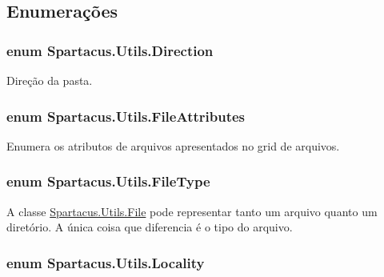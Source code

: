 \subsection{Enumerações}
\hypertarget{namespaceSpartacus_1_1Utils_a71ccbdd8fb504defa1e9ea38771651e5}{
\subsubsection[{Direction}]{\setlength{\rightskip}{0pt plus 5cm}enum {\bf Spartacus.\+Utils.\+Direction}}}\label{namespaceSpartacus_1_1Utils_a71ccbdd8fb504defa1e9ea38771651e5}


Direção da pasta. 

\hypertarget{namespaceSpartacus_1_1Utils_a81ab9f259fbae2db00ea1cd29690a6cf}{
\subsubsection[{File\+Attributes}]{\setlength{\rightskip}{0pt plus 5cm}enum {\bf Spartacus.\+Utils.\+File\+Attributes}}}\label{namespaceSpartacus_1_1Utils_a81ab9f259fbae2db00ea1cd29690a6cf}


Enumera os atributos de arquivos apresentados no grid de arquivos. 

\hypertarget{namespaceSpartacus_1_1Utils_a2bc44488e88db523cb2dcffaa6e77541}{
\subsubsection[{File\+Type}]{\setlength{\rightskip}{0pt plus 5cm}enum {\bf Spartacus.\+Utils.\+File\+Type}}}\label{namespaceSpartacus_1_1Utils_a2bc44488e88db523cb2dcffaa6e77541}


A classe \hyperlink{classSpartacus_1_1Utils_1_1File}{Spartacus.\+Utils.\+File} pode representar tanto um arquivo quanto um diretório. A única coisa que diferencia é o tipo do arquivo. 

\hypertarget{namespaceSpartacus_1_1Utils_a64d6efe7b3923d4631036138e1b8b57f}{
\subsubsection[{Locality}]{\setlength{\rightskip}{0pt plus 5cm}enum {\bf Spartacus.\+Utils.\+Locality}}}\label{namespaceSpartacus_1_1Utils_a64d6efe7b3923d4631036138e1b8b57f}


